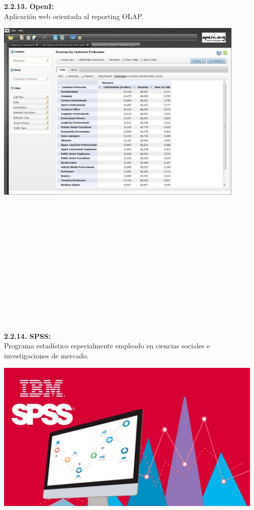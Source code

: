 \begin{flushleft}
\textbf{2.2.13. OpenI: }\\
Aplicación web orientada al reporting OLAP.
	\begin{center}
	\includegraphics[width=12cm]{./Imagenes/BIimagen13}
	\end{center}
\textbf{}\\
\textbf{}\\
\textbf{}\\
\textbf{}\\
\textbf{}\\
	\textbf{}\\
\textbf{}\\
\textbf{}\\
\textbf{}\\	
\textbf{}\\
\textbf{}\\	
\textbf{}\\
\textbf{}\\
\textbf{2.2.14. SPSS: }\\
Programa estadístico especialmente empleado en ciencias sociales e investigaciones de mercado.
	\begin{center}
	\includegraphics[width=13cm]{./Imagenes/BIimagen14}
	\end{center}
\textbf{}\\
	

\end{flushleft}

